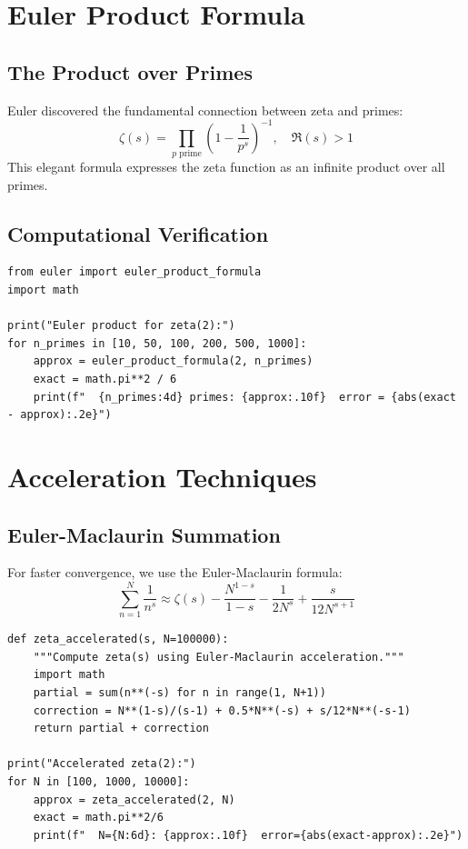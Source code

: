 \section{Euler Product Formula}

\subsection{The Product over Primes}

Euler discovered the fundamental connection between zeta and primes:
\[
\zeta(s) = \prod_{p \text{ prime}} \left(1 - \frac{1}{p^s}\right)^{-1}, \quad \Re(s) > 1
\]
This elegant formula expresses the zeta function as an infinite product over all primes.

\subsection{Computational Verification}

\begin{lstlisting}[caption={Euler product for $\zeta(2)$}, label=lst:euler_product_zeta]
from euler import euler_product_formula
import math

print("Euler product for zeta(2):")
for n_primes in [10, 50, 100, 200, 500, 1000]:
    approx = euler_product_formula(2, n_primes)
    exact = math.pi**2 / 6
    print(f"  {n_primes:4d} primes: {approx:.10f}  error = {abs(exact - approx):.2e}")
\end{lstlisting}

\section{Acceleration Techniques}

\subsection{Euler-Maclaurin Summation}

For faster convergence, we use the Euler-Maclaurin formula:
\[
\sum_{n=1}^{N} \frac{1}{n^s} \approx \zeta(s) - \frac{N^{1-s}}{1-s} - \frac{1}{2N^s} + \frac{s}{12N^{s+1}}
\]

\begin{lstlisting}[caption={Euler acceleration for the Basel series}, label=lst:euler_acceleration_basel]
def zeta_accelerated(s, N=100000):
    """Compute zeta(s) using Euler-Maclaurin acceleration."""
    import math
    partial = sum(n**(-s) for n in range(1, N+1))
    correction = N**(1-s)/(s-1) + 0.5*N**(-s) + s/12*N**(-s-1)
    return partial + correction

print("Accelerated zeta(2):")
for N in [100, 1000, 10000]:
    approx = zeta_accelerated(2, N)
    exact = math.pi**2/6
    print(f"  N={N:6d}: {approx:.10f}  error={abs(exact-approx):.2e}")
\end{lstlisting}

